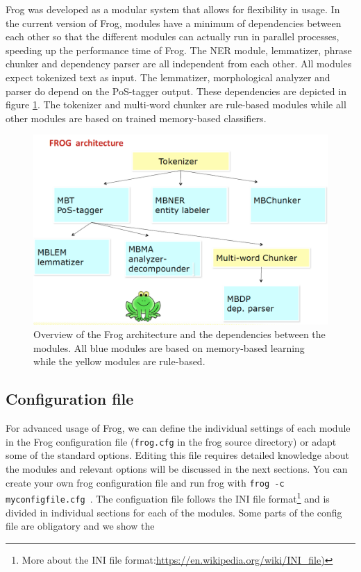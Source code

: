 \documentclass{book}
\begin{document}
Frog was developed as a modular system that allows for flexibility in usage.
In the current version of Frog, modules have a minimum of dependencies between each other so that the different modules can actually run in parallel processes, speeding up the performance time of Frog. The NER module, lemmatizer, phrase chunker and dependency parser are all independent from each other. All modules expect tokenized text as input. The lemmatizer, morphological analyzer and parser do depend on the PoS-tagger output.
These dependencies are depicted in figure \ref{fig-arch}. The tokenizer and multi-word chunker are rule-based modules while all other modules are based on trained memory-based classifiers.


\begin{figure}[ht]
  \centering
   \includegraphics[scale=0.3]{frogarchitecture}
  \caption{Overview of the Frog architecture and the dependencies between the modules. All blue modules are based on memory-based learning while the yellow modules are rule-based.}
  \label{fig-arch}
\end{figure}

\subsection{Configuration file}

For advanced usage of Frog, we can define the individual settings of each
module in the Frog configuration file ({\tt frog.cfg} in the frog source directory) or adapt some of the standard options. Editing this file requires detailed knowledge about the modules and relevant options will be discussed in the next sections. You can create your own frog configuration file and run frog with {\tt frog -c myconfigfile.cfg }.
The configuation file follows the INI file format\footnote{More about the INI file format:\url{https://en.wikipedia.org/wiki/INI_file)}} and is divided in individual sections for each of the modules. Some parts of the config file are obligatory and we show the
\end{document}
